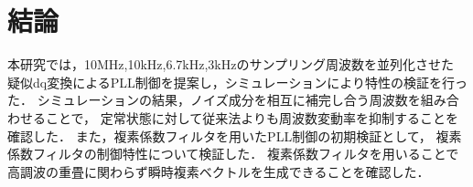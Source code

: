 
\section{結論}
本研究では，10MHz,10kHz,6.7kHz,3kHzのサンプリング周波数を並列化させた
疑似dq変換によるPLL制御を提案し，シミュレーションにより特性の検証を行った．
シミュレーションの結果，ノイズ成分を相互に補完し合う周波数を組み合わせることで，
定常状態に対して従来法よりも周波数変動率を抑制することを確認した．
また，複素係数フィルタを用いたPLL制御の初期検証として，
複素係数フィルタの制御特性について検証した．
複素係数フィルタを用いることで高調波の重畳に関わらず瞬時複素ベクトルを生成できることを確認した．





